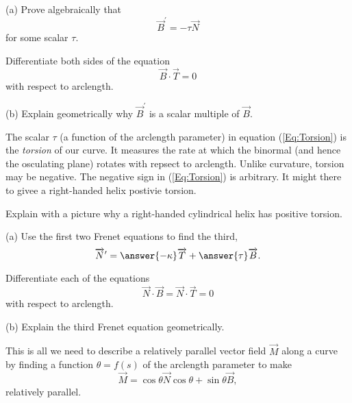 \documentclass{ximera}
\begin{document}
\begin{exercise}  \label{E:Kldsfttdd}
(a) Prove algebraically that
\begin{equation}
   \overrightarrow{B}^\prime = - \tau \overrightarrow{N}   \label{Eq:Torsion}
\end{equation}
for some scalar $\tau$. 

\begin{hint}
Differentiate both sides of the equation
\[
  \overrightarrow{B} \cdot \overrightarrow{T} = 0
\]
with respect to arclength.
\end{hint}

(b) Explain geometrically why $\overrightarrow{B}^\prime$ is a scalar multiple of $\overrightarrow{B}$. 
\end{exercise}

The scalar $\tau$ (a function of the arclength parameter) in equation (\ref{Eq:Torsion}) is the \emph{torsion} of our curve. It measures the rate at which the binormal (and hence the osculating plane) rotates with repsect to arclength. Unlike curvature, torsion may be negative. The negative sign in (\ref{Eq:Torsion}) is arbitrary. It might there to givee a right-handed helix 
postivie torsion.

\begin{exercise} \label{E:dsft4etdg}
Explain with a picture why a right-handed cylindrical helix has positive torsion.
\end{exercise}

\begin{exercise}   \label{QQ:Podsfgttga}
(a) Use the first two Frenet equations to find the third,
\[
     \overrightarrow{N}^\prime = \answer{-\kappa} \overrightarrow{T} + \answer{\tau} \overrightarrow{B} .
\]
\begin{hint}
Differentiate each of the equations
\[
 \overrightarrow{N}\cdot \overrightarrow{B} = \overrightarrow{N}\cdot\overrightarrow{T} = 0
\]
with respect to arclength.
\end{hint}

(b) Explain the third Frenet equation geometrically.
\end{exercise}


This is all we need to describe a relatively parallel vector field $\overrightarrow{M}$ along a curve by finding a function $\theta = f(s)$ of the arclength parameter to make
\begin{equation}
          \overrightarrow{M} = \cos\theta \overrightarrow{N} \cos \theta + \sin\theta \overrightarrow{B} ,   \label{Eq:Bishop}
\end{equation}
relatively parallel.
\end{document}
